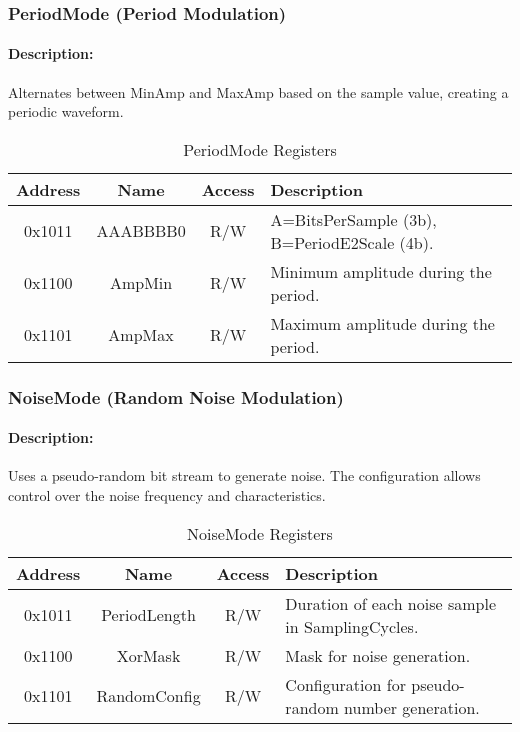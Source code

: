 \subsubsection{PeriodMode (Period Modulation)}
\paragraph{Description:}
Alternates between MinAmp and MaxAmp based on the sample value, creating a periodic waveform.

\begin{table}[H]
    \centering
    \begin{tabular}{|c|c|c|l|}
        \hline
        \textbf{Address} & \textbf{Name}        & \textbf{Access} & \textbf{Description} \\
        \hline
        0x1011 & AAABBBB0         & R/W & A=BitsPerSample (3b), B=PeriodE2Scale (4b). \\
        0x1100 & AmpMin           & R/W & Minimum amplitude during the period. \\
        0x1101 & AmpMax           & R/W & Maximum amplitude during the period. \\
        \hline
    \end{tabular}
    \caption{PeriodMode Registers}
\end{table}

\subsubsection{NoiseMode (Random Noise Modulation)}
\paragraph{Description:}
Uses a pseudo-random bit stream to generate noise. The configuration allows control over the noise frequency and characteristics.

\begin{table}[H]
    \centering
    \begin{tabular}{|c|c|c|l|}
        \hline
        \textbf{Address} & \textbf{Name}        & \textbf{Access} & \textbf{Description} \\
        \hline
        0x1011 & PeriodLength    & R/W & Duration of each noise sample in SamplingCycles. \\
        0x1100 & XorMask         & R/W & Mask for noise generation. \\
        0x1101 & RandomConfig    & R/W & Configuration for pseudo-random number generation. \\
        \hline
    \end{tabular}
    \caption{NoiseMode Registers}
\end{table}

